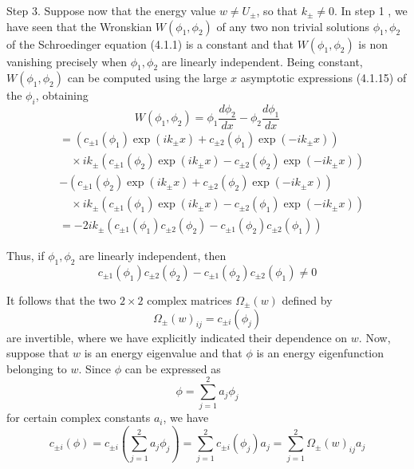 \documentclass{article}
\begin{document}
Step 3. Suppose now that the energy value $w \neq U_{ \pm}$, so that $k_{ \pm} \neq 0$. In step 1 , we have seen that the Wronskian $W\left(\phi_{1}, \phi_{2}\right)$ of any two non trivial solutions $\phi_{1}, \phi_{2}$ of the Schroedinger equation (4.1.1) is a constant and that $W\left(\phi_{1}, \phi_{2}\right)$ is non vanishing precisely when $\phi_{1}, \phi_{2}$ are linearly independent. Being constant, $W\left(\phi_{1}, \phi_{2}\right)$ can be computed using the large $x$ asymptotic expressions (4.1.15) of the $\phi_{i}$, obtaining
$$
\begin{equation*}
W\left(\phi_{1}, \phi_{2}\right)=\phi_{1} \frac{d \phi_{2}}{d x}-\phi_{2} \frac{d \phi_{1}}{d x} \tag{4.1.17}
\end{equation*}
$$
$$
\begin{aligned}
& =\left(c_{ \pm 1}\left(\phi_{1}\right) \exp \left(i k_{ \pm} x\right)+c_{ \pm 2}\left(\phi_{1}\right) \exp \left(-i k_{ \pm} x\right)\right) \\
& \quad \times i k_{ \pm}\left(c_{ \pm 1}\left(\phi_{2}\right) \exp \left(i k_{ \pm} x\right)-c_{ \pm 2}\left(\phi_{2}\right) \exp \left(-i k_{ \pm} x\right)\right) \\
& -\left(c_{ \pm 1}\left(\phi_{2}\right) \exp \left(i k_{ \pm} x\right)+c_{ \pm 2}\left(\phi_{2}\right) \exp \left(-i k_{ \pm} x\right)\right) \\
& \quad \times i k_{ \pm}\left(c_{ \pm 1}\left(\phi_{1}\right) \exp \left(i k_{ \pm} x\right)-c_{ \pm 2}\left(\phi_{1}\right) \exp \left(-i k_{ \pm} x\right)\right) \\
& =-2 i k_{ \pm}\left(c_{ \pm 1}\left(\phi_{1}\right) c_{ \pm 2}\left(\phi_{2}\right)-c_{ \pm 1}\left(\phi_{2}\right) c_{ \pm 2}\left(\phi_{1}\right)\right)
\end{aligned}
$$

Thus, if $\phi_{1}, \phi_{2}$ are linearly independent, then
$$
\begin{equation*}
c_{ \pm 1}\left(\phi_{1}\right) c_{ \pm 2}\left(\phi_{2}\right)-c_{ \pm 1}\left(\phi_{2}\right) c_{ \pm 2}\left(\phi_{1}\right) \neq 0 \tag{4.1.18}
\end{equation*}
$$

It follows that the two $2 \times 2$ complex matrices $\Omega_{ \pm}(w)$ defined by
$$
\begin{equation*}
\Omega_{ \pm}(w)_{i j}=c_{ \pm i}\left(\phi_{j}\right) \tag{4.1.19}
\end{equation*}
$$
are invertible, where we have explicitly indicated their dependence on $w$.
Now, suppose that $w$ is an energy eigenvalue and that $\phi$ is an energy eigenfunction belonging to $w$. Since $\phi$ can be expressed as
$$
\begin{equation*}
\phi=\sum_{j=1}^{2} a_{j} \phi_{j} \tag{4.1.20}
\end{equation*}
$$
for certain complex constants $a_{i}$, we have
$$
\begin{equation*}
c_{ \pm i}(\phi)=c_{ \pm i}\left(\sum_{j=1}^{2} a_{j} \phi_{j}\right)=\sum_{j=1}^{2} c_{ \pm i}\left(\phi_{j}\right) a_{j}=\sum_{j=1}^{2} \Omega_{ \pm}(w)_{i j} a_{j} \tag{4.1.21}
\end{equation*}
$$
\end{document}
